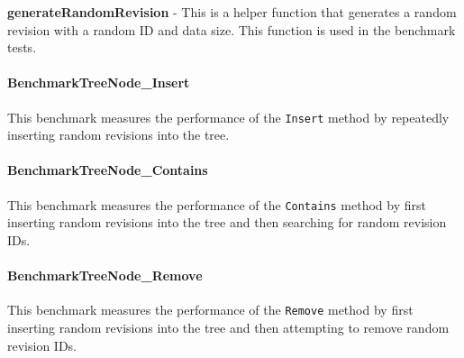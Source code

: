 \textbf{generateRandomRevision} - This is a helper function that generates a random revision with a random ID and data size. This function is used in the benchmark tests.

\paragraph{BenchmarkTreeNode\_Insert}
This benchmark measures the performance of the \lstinline{Insert} method by repeatedly inserting random revisions into the tree.

\paragraph{BenchmarkTreeNode\_Contains}
This benchmark measures the performance of the \lstinline{Contains} method by first inserting random revisions into the tree and then searching for random revision IDs.

\paragraph{BenchmarkTreeNode\_Remove}
This benchmark measures the performance of the \lstinline{Remove} method by first inserting random revisions into the tree and then attempting to remove random revision IDs.



